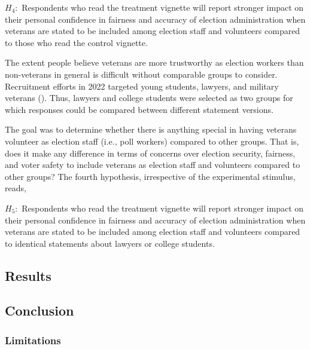 \documentclass[
  11pt,
  a4paper,
]{scrartcl}
\begin{document}
\(H_{4}:\) Respondents who read the treatment vignette will report
stronger impact on their personal confidence in fairness and accuracy of
election administration when veterans are stated to be included among
election staff and volunteers compared to those who read the control
vignette.

The extent people believe veterans are more trustworthy as election
workers than non-veterans in general is difficult without comparable
groups to consider. Recruitment efforts in 2022 targeted young students,
lawyers, and military veterans ().
Thus, lawyers and college students were selected as two groups for which
responses could be compared between different statement versions.

The goal was to determine whether there is anything special in having
veterans volunteer as election staff (i.e., poll workers) compared to
other groups. That is, does it make any difference in terms of concerns
over election security, fairness, and voter safety to include veterans
as election staff and volunteers compared to other groups? The fourth
hypothesis, irrespective of the experimental stimulus, reads,

\(H_{5}:\) Respondents who read the treatment vignette will report
stronger impact on their personal confidence in fairness and accuracy of
election administration when veterans are stated to be included among
election staff and volunteers compared to identical statements about
lawyers or college students.

\subsection{Results}\label{results}

\pagebreak

\subsection{Conclusion}\label{conclusion}

\subsubsection{Limitations}\label{limitations}
\end{document}
